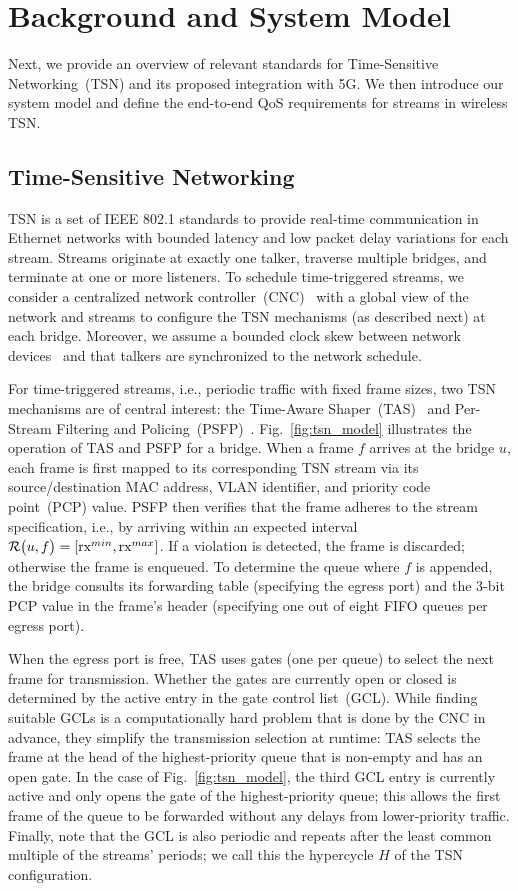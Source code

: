

\section{Background and System Model} \label{sec:background}
Next, we provide an overview of relevant standards for Time-Sensitive Networking~(TSN) and its proposed integration with 5G.
We then introduce our system model and define the end-to-end QoS requirements for streams in wireless TSN.

\subsection{Time-Sensitive Networking} \label{sec:tsn}
TSN is a set of IEEE 802.1 standards to provide real-time communication in Ethernet networks with bounded latency and low packet delay variations for each stream.
Streams originate at exactly one talker, traverse multiple bridges, and terminate at one or more listeners.
To schedule time-triggered streams, we consider a centralized network controller~(CNC)~\cite{8514112} with a global view of the network and streams to configure the TSN mechanisms (as described next) at each bridge.
Moreover, we assume a bounded clock skew between network devices~\cite{802.1AS} and that talkers are synchronized to the network schedule.

For time-triggered streams, i.e., periodic traffic with fixed frame sizes, two TSN mechanisms are of central interest: the Time-Aware Shaper~(TAS)~\cite{802.1Qbv} and Per-Stream Filtering and Policing~(PSFP)~\cite{802.1Qci}.
Fig.~\ref{fig:tsn_model} illustrates the operation of TAS and PSFP for a bridge.
When a frame $f$ arrives at the bridge $u$, each frame is first mapped to its corresponding TSN stream via its source/destination MAC address, VLAN identifier, and priority code point~(PCP) value.
PSFP then verifies that the frame adheres to the stream specification, i.e., by arriving within an expected interval $\R{u, f} = [\text{rx}^{min}, \text{rx}^{max}]$. 
If a violation is detected, the frame is discarded; otherwise the frame is enqueued.
To determine the queue where $f$ is appended, the bridge consults its forwarding table (specifying the egress port) and the 3-bit PCP value in the frame's header (specifying one out of eight FIFO queues per egress port).

When the egress port is free, TAS uses gates (one per queue) to select the next frame for transmission.
Whether the gates are currently open or closed is determined by the active entry in the gate control list~(GCL).
While finding suitable GCLs is a computationally hard problem that is done by the CNC in advance, they simplify the transmission selection at runtime:
TAS selects the frame at the head of the highest-priority queue that is non-empty and has an open gate.
In the case of Fig.~\ref{fig:tsn_model}, the third GCL entry is currently active and only opens the gate of the highest-priority queue; 
this allows the first frame of the queue to be forwarded without any delays from lower-priority traffic.
Finally, note that the GCL is also periodic and repeats after the least common multiple of the streams' periods; we call this the hypercycle $H$ of the TSN configuration.

